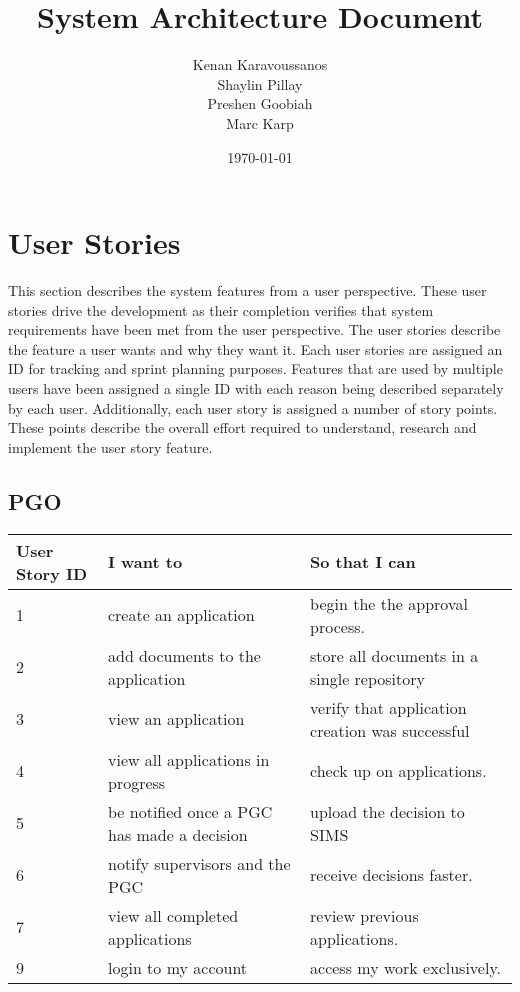 \documentclass[11pt]{article}
\title{ System Architecture Document}
\author{ Kenan Karavoussanos \\ Shaylin Pillay \\ Preshen Goobiah \\ Marc Karp}
\date{\today}
\begin{document}
\maketitle
\newpage
\tableofcontents
\newpage
\section{User Stories}
This section describes the system features from a user perspective. These user stories drive the development as their completion verifies that system requirements have been met from the user perspective. The user stories describe the feature a user wants and why they want it. Each user stories are assigned an ID for tracking and sprint planning purposes. Features that are used by multiple users have been assigned a single ID with each reason being described separately by each user. Additionally, each user story is assigned a number of story points. These points describe the overall effort required to understand, research and implement the user story feature.
\subsection{PGO}
\begin{table}[H]
	\hskip-4.0cm\begin{tabular}{@{}|l|l|l|@{}}

  \toprule                                                                            
		\textbf{User Story ID}  & \textbf{I want to}                                & \textbf{So that I can}                                      \\ \midrule

		  1                    & create an application                             & begin the the approval process.               \\ \midrule
		  2                    & add documents to the application                  & store all documents in a single repository               \\ \midrule
		  3                    & view an application				                      & verify that application creation was successful                    \\ \midrule
		  4                    & view all applications in progress                  & check up on applications.                                   \\ \midrule
		  5                    & be notified once a PGC has made a decision        & upload the decision to SIMS      \\ \midrule
		  6                   & notify supervisors and the PGC      & receive decisions faster.                             \\ \midrule
		  7                   & view all completed applications                   & review previous applications. \\ \midrule

			9 & login to my account & access my work exclusively. \\ \bottomrule
	\end{tabular}
\end{table}
\end{document}
